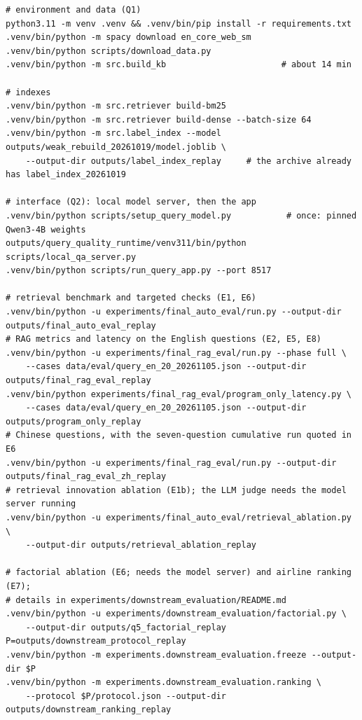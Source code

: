 \documentclass[10pt,twocolumn,a4paper]{article}
\begin{document}
\begin{Verbatim}[fontsize=\footnotesize, frame=single, framesep=3mm, rulecolor=\color{black!25}]
# environment and data (Q1)
python3.11 -m venv .venv && .venv/bin/pip install -r requirements.txt
.venv/bin/python -m spacy download en_core_web_sm
.venv/bin/python scripts/download_data.py
.venv/bin/python -m src.build_kb                       # about 14 min

# indexes
.venv/bin/python -m src.retriever build-bm25
.venv/bin/python -m src.retriever build-dense --batch-size 64
.venv/bin/python -m src.label_index --model outputs/weak_rebuild_20261019/model.joblib \
    --output-dir outputs/label_index_replay     # the archive already has label_index_20261019

# interface (Q2): local model server, then the app
.venv/bin/python scripts/setup_query_model.py           # once: pinned Qwen3-4B weights
outputs/query_quality_runtime/venv311/bin/python scripts/local_qa_server.py
.venv/bin/python scripts/run_query_app.py --port 8517

# retrieval benchmark and targeted checks (E1, E6)
.venv/bin/python -u experiments/final_auto_eval/run.py --output-dir outputs/final_auto_eval_replay
# RAG metrics and latency on the English questions (E2, E5, E8)
.venv/bin/python -u experiments/final_rag_eval/run.py --phase full \
    --cases data/eval/query_en_20_20261105.json --output-dir outputs/final_rag_eval_replay
.venv/bin/python experiments/final_rag_eval/program_only_latency.py \
    --cases data/eval/query_en_20_20261105.json --output-dir outputs/program_only_replay
# Chinese questions, with the seven-question cumulative run quoted in E6
.venv/bin/python -u experiments/final_rag_eval/run.py --output-dir outputs/final_rag_eval_zh_replay
# retrieval innovation ablation (E1b); the LLM judge needs the model server running
.venv/bin/python -u experiments/final_auto_eval/retrieval_ablation.py \
    --output-dir outputs/retrieval_ablation_replay

# factorial ablation (E6; needs the model server) and airline ranking (E7);
# details in experiments/downstream_evaluation/README.md
.venv/bin/python -u experiments/downstream_evaluation/factorial.py \
    --output-dir outputs/q5_factorial_replay
P=outputs/downstream_protocol_replay
.venv/bin/python -m experiments.downstream_evaluation.freeze --output-dir $P
.venv/bin/python -m experiments.downstream_evaluation.ranking \
    --protocol $P/protocol.json --output-dir outputs/downstream_ranking_replay


\end{Verbatim}
\end{document}
